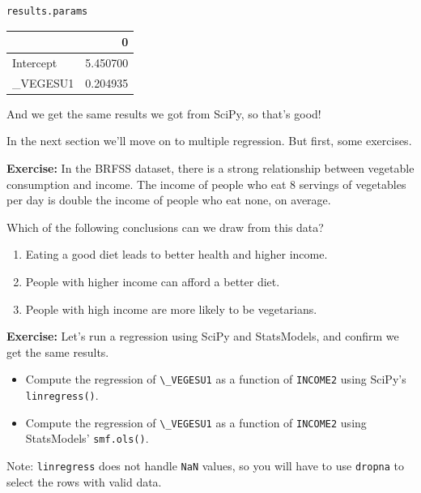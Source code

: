 \begin{lstlisting}[language=Python,style=source]
results.params
\end{lstlisting}

\begin{tabular}{lr}
\toprule
{} &         0 \\
\midrule
Intercept &  5.450700 \\
\_VEGESU1  &  0.204935 \\
\bottomrule
\end{tabular}

And we get the same results we got from SciPy, so that's good!

In the next section we'll move on to multiple regression. But first,
some exercises.

\textbf{Exercise:} In the BRFSS dataset, there is a strong relationship
between vegetable consumption and income. The income of people who eat 8
servings of vegetables per day is double the income of people who eat
none, on average.

Which of the following conclusions can we draw from this data?

\begin{enumerate}
\def\labelenumi{\Alph{enumi}.}
\item
  Eating a good diet leads to better health and higher income.
\item
  People with higher income can afford a better diet.
\item
  People with high income are more likely to be vegetarians.
\end{enumerate}

\textbf{Exercise:} Let's run a regression using SciPy and StatsModels,
and confirm we get the same results.

\begin{itemize}
\item
  Compute the regression of \passthrough{\lstinline!\_VEGESU1!} as a
  function of \passthrough{\lstinline!INCOME2!} using SciPy's
  \passthrough{\lstinline!linregress()!}.
\item
  Compute the regression of \passthrough{\lstinline!\_VEGESU1!} as a
  function of \passthrough{\lstinline!INCOME2!} using StatsModels'
  \passthrough{\lstinline!smf.ols()!}.
\end{itemize}

Note: \passthrough{\lstinline!linregress!} does not handle
\passthrough{\lstinline!NaN!} values, so you will have to use
\passthrough{\lstinline!dropna!} to select the rows with valid data.

